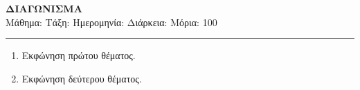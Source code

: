 \documentclass[12pt,a4paper]{article}
\title{}
\author{}
\date{}
\begin{document}

\begin{center}
  {\Large\textbf{ΔΙΑΓΩΝΙΣΜΑ}}\\[0.3em]
  Μάθημα: \quad Τάξη: \quad Ημερομηνία: \quad Διάρκεια: \quad Μόρια: 100
\end{center}
\rule{\textwidth}{0.4pt}

\begin{enumerate}[label=\textbf{Θέμα \Alph*.}]
  \item Εκφώνηση πρώτου θέματος.
  \item Εκφώνηση δεύτερου θέματος.
\end{enumerate}
\end{document}

